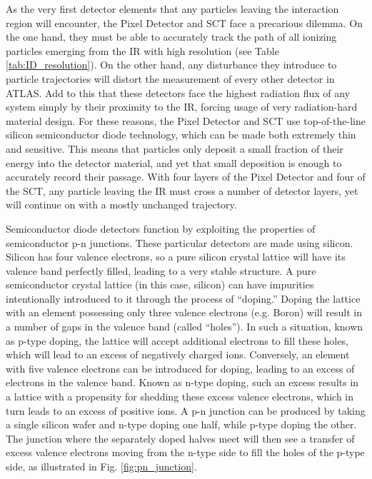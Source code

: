        As the very first detector elements that any particles leaving the interaction region will encounter, the Pixel Detector and SCT face a precarious dilemma.
        On the one hand, they must be able to accurately track the path of all ionizing particles
            emerging from the IR with high resolution (see Table \ref{tab:ID_resolution}).
        On the other hand, any disturbance they introduce to particle trajectories will distort the measurement of every other detector in ATLAS.
        Add to this that these detectors face the highest radiation flux of any system simply by their proximity to the IR,
            forcing usage of very radiation-hard material design.
        For these reasons, the Pixel Detector and SCT use top-of-the-line silicon semiconductor diode technology,
            which can be made both extremely thin and sensitive. 
        This means that particles only deposit a small fraction of their energy into the detector material,
            and yet that small deposition is enough to accurately record their passage.
        With four layers of the Pixel Detector and four of the SCT, any particle leaving the IR must cross a number of detector layers,
            yet will continue on with a mostly unchanged trajectory.

        

        Semiconductor diode detectors function by exploiting the properties of semiconductor p-n junctions.
        These particular detectors are made using silicon.
        Silicon has four valence electrons, so a pure silicon crystal lattice will have its valence band perfectly filled, leading to a very stable structure.
        A pure semiconductor crystal lattice (in this case, silicon) can have impurities intentionally introduced to it through the process of ``doping.''
        Doping the lattice with an element possessing only three valence electrons (e.g. Boron) will result in a number of gaps in the valence band (called ``holes'').
        In such a situation, known as p-type doping, the lattice will accept additional electrons to fill these holes, which will lead to an excess of negatively charged ions.
        Conversely, an element with five valence electrons can be introduced for doping, leading to an excess of electrons in the valence band.
        Known as n-type doping, such an excess results in a lattice with a propensity for shedding these excess valence electrons, which in turn leads to an excess of positive ions.
        A p-n junction can be produced by taking a single silicon wafer and n-type doping one half, while p-type doping the other.
        The junction where the separately doped halves meet will then see a transfer of excess valence electrons moving from the n-type side to fill the holes of the p-type side, as illustrated in Fig. \ref{fig:pn_junction}.

